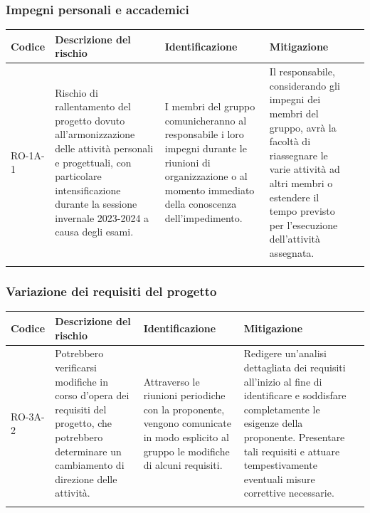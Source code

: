 \documentclass{article}
\begin{document}
\subsubsection{Impegni personali e accademici}
\begin{table}[h]
    \centering
    \begin{tabularx}{\textwidth}{l>{\RaggedRight}X>{\RaggedRight}X>{\RaggedRight}X>{\RaggedRight}X}
    \toprule
    \rowcolor{gray!50}
    \textbf{Codice} & \textbf{Descrizione del rischio} & \textbf{Identificazione} & \textbf{Mitigazione} \\
    \midrule
    \addlinespace 
    RO-1A-1 & 
    Rischio di rallentamento del progetto dovuto all'armonizzazione delle attività personali e progettuali, con particolare intensificazione durante la sessione invernale 2023-2024 a causa degli esami. & 
    I membri del gruppo comunicheranno al responsabile i loro impegni durante le riunioni di organizzazione o al momento immediato della conoscenza dell'impedimento.& 
    Il responsabile, considerando gli impegni dei membri del gruppo, avrà la facoltà di riassegnare le varie attività ad altri membri o estendere il tempo previsto per l'esecuzione dell'attività assegnata. \\  
    \bottomrule
    \addlinespace 
    \end{tabularx}
\end{table}

\subsubsection{Variazione dei requisiti del progetto}
\begin{table}[h]
    \centering
    \begin{tabularx}{\textwidth}{l>{\RaggedRight}X>{\RaggedRight}X>{\RaggedRight}X>{\RaggedRight}X}
    \toprule
    \rowcolor{gray!50}
    \textbf{Codice} & \textbf{Descrizione del rischio} & \textbf{Identificazione} & \textbf{Mitigazione} \\
    \midrule
    \addlinespace 
    RO-3A-2 & 
    Potrebbero verificarsi modifiche in corso d'opera dei requisiti del progetto, che potrebbero determinare un cambiamento di direzione delle attività. &
    Attraverso le riunioni periodiche con la proponente, vengono comunicate in modo esplicito al gruppo le modifiche di alcuni requisiti.&
    Redigere un'analisi dettagliata dei requisiti all'inizio al fine di identificare e soddisfare completamente le esigenze della proponente. Presentare tali requisiti e attuare tempestivamente eventuali misure correttive necessarie. \\
    \bottomrule
    \addlinespace 
    \end{tabularx}
\end{table}
\newpage
\end{document}
